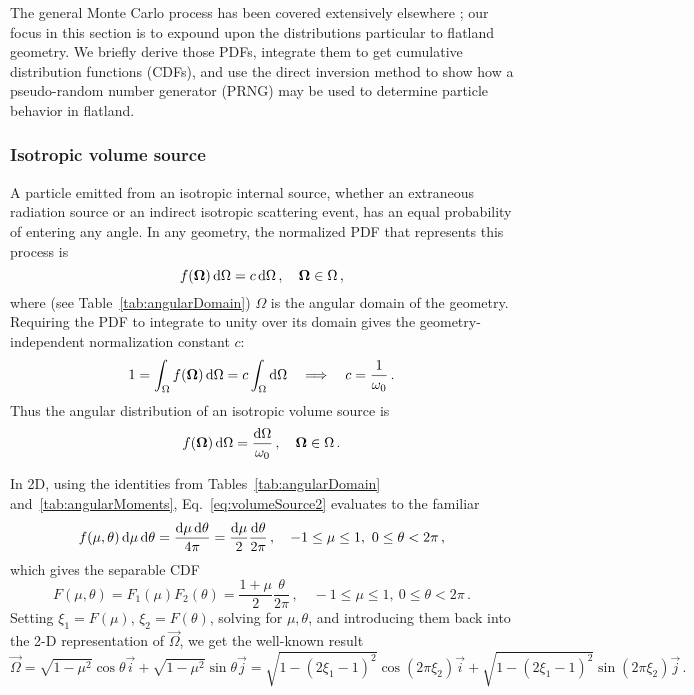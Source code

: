 The general Monte Carlo process has been covered extensively elsewhere
\cite{Lew1984,Bro2004a}; our focus in this section is to expound upon the
distributions particular to flatland geometry. We briefly derive those PDFs,
integrate them to get cumulative distribution functions
(CDFs), and use the direct inversion method to show how a pseudo-random number
generator (PRNG) may be used to determine particle behavior in flatland.

\subsubsection{Isotropic volume source}
A particle emitted from an isotropic internal source, whether an extraneous
radiation source or an indirect isotropic scattering event, has an equal
probability of entering any angle. In any geometry, the normalized PDF that
represents this process is
\begin{equation}\label{eq:volumeSource1}
  f(\bm{\Omega}) \mathop{}\!\mathrm{d} \Omega = c \mathop{}\!\mathrm{d} \Omega \,,
  \quad \bm{\Omega} \in \Omega \,,
\end{equation}
where (see Table~\ref{tab:angularDomain}) $\Omega$ is the angular domain of the
geometry.
Requiring the PDF to integrate to unity over its domain gives the
geometry-independent normalization constant $c$:
\begin{align*}
  1 = \int_{\Omega} f(\bm{\Omega}) \mathop{}\!\mathrm{d}\Omega
  = c \int_{\Omega} \mathop{}\!\mathrm{d}\Omega
  \quad \Longrightarrow \quad
  c = \frac{1}{\omega_0}\,.
\end{align*}
Thus the angular distribution of an isotropic volume source is
\begin{equation}\label{eq:volumeSource2}
  f(\bm{\Omega}) \mathop{}\!\mathrm{d} \Omega = \frac{\mathop{}\!\mathrm{d}\Omega}{\omega_0} \,,
  \quad \bm{\Omega} \in \Omega\,.
\end{equation}

In 2D, using the identities from Tables~\ref{tab:angularDomain}
and~\ref{tab:angularMoments}, Eq.~\eqref{eq:volumeSource2} evaluates to the
familiar
\begin{equation*}
  f(\mu,\theta) \mathop{}\!\mathrm{d}\mu\mathop{}\!\mathrm{d}\theta = \frac{\mathop{}\!\mathrm{d}\mu\mathop{}\!\mathrm{d}\theta}{4\pi} 
  = \frac{\mathop{}\!\mathrm{d}\mu}{2}\frac{\mathop{}\!\mathrm{d}\theta}{2\pi}
  \,,
  \quad -1\le \mu \le 1,\ 0 \le \theta < 2\pi\,,
\end{equation*}
which gives the separable CDF
\begin{equation*}
  F(\mu,\theta) = F_1(\mu) F_2(\theta)
  = \frac{1 + \mu}{2}\frac{\theta}{2\pi}\,,
  \quad -1\le \mu \le 1,\ 0 \le \theta < 2\pi\,.
\end{equation*}
Setting $\xi_1 = F(\mu)$, $\xi_2 = F(\theta)$, solving for $\mu,\theta$, and
introducing them back into the 2-D representation of $\vec{\Omega}$, we get the
well-known result
\begin{equation*}
  \vec{\Omega} = \sqrt{1-\mu^2} \cos \theta \vec{i}
   + \sqrt{1-\mu^2} \sin \theta \vec{j}
  = \sqrt{1-(2\xi_1-1)^2} \cos(2\pi\xi_2) \vec{i}
   + \sqrt{1-(2\xi_1-1)^2} \sin(2\pi\xi_2) \vec{j}\,.
\end{equation*}

